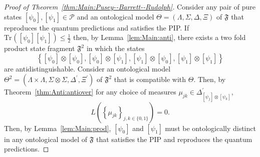 \documentclass[DIV=calc,paper=a4,fontsize=11pt,twocolumn]{scrartcl} %
\theoremstyle{definition}
\theoremstyle{plain}
\newcommand{\Proj}[1]{\ensuremath{\left [ #1 \right ]}}
\newcommand{\Tr}[2][]{\ensuremath{\text{Tr}_{#1} \left ( #2 \right )}}
\begin{document}
\begin{proof}[Proof of Theorem~\ref{thm:Main:Pusey--Barrett--Rudolph}]
Consider any pair of pure states $\Proj{\psi_0}, \Proj{\psi_1} \in
\mathcal{P}$ and an ontological model $\Theta = (\Lambda, \Sigma,
\Delta, \Xi)$ of $\mathfrak{F}$ that reproduces the quantum
predictions and satisfies the PIP\@.  If
$\Tr{\Proj{\psi_0}\Proj{\psi_1}} \leq \frac{1}{2}$ then, by
Lemma~\ref{lem:Main:anti}, there exists a two fold product state
fragment $\mathfrak{F}^2$ in which the states
\begin{equation}
\left \{ \Proj{\psi_0} \otimes \Proj{\psi_0}, \Proj{\psi_0}
\otimes \Proj{\psi_1}, \Proj{\psi_1} \otimes \Proj{\psi_0},
\Proj{\psi_1} \otimes \Proj{\psi_1}\right \}
\end{equation}
are antidistinguishable.  Consider an ontological model $\Theta^2 =
(\Lambda \times \Lambda, \Sigma \otimes \Sigma, \Delta^{\prime},
\Xi^{\prime})$ of $\mathfrak{F}^2$ that is compatible with $\Theta$.
Then, by Theorem~\ref{thm:Anti:antiover} for any choice of measures
$\mu_{jk} \in \Delta^{\prime}_{\Proj{\psi_j}\otimes\Proj{\psi_k}}$,
\begin{equation}
L \left ( \left \{ \mu_{jk} \right \}_{j,k \in \{0,1\}} \right
) = 0.
\end{equation}
Then, by Lemma~\ref{lem:Main:prod}, $\Proj{\psi_0}$ and
$\Proj{\psi_1}$ must be ontologically distinct in any ontological
model of $\mathfrak{F}$ that satisfies the PIP and reproduces the
quantum predictions.


\end{proof}
\end{document}
